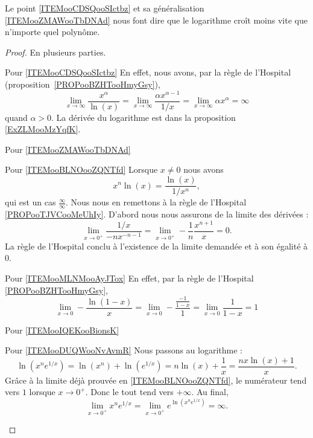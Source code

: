 Le point \ref{ITEMooCDSQooSIctbz} et sa généralisation \ref{ITEMooZMAWooTbDNAd} nous font dire que le logarithme croît moins vite que n'importe quel polynôme.

\begin{proof}
	En plusieurs parties.
	\begin{subproof}
		\item[Pour \ref{ITEMooCDSQooSIctbz}]
		En effet, nous avons, par la règle de l'Hospital (proposition~\ref{PROPooBZHTooHmyGsy}),
		\begin{equation}
			\lim_{x\to\infty} \frac{ x^{\alpha} }{ \ln(x) }=\lim_{x\to\infty} \frac{ \alpha x^{\alpha-1} }{ 1/x }=\lim_{x\to\infty} \alpha x^{\alpha}=\infty
		\end{equation}
		quand \( \alpha>0\). La dérivée du logarithme est dans la proposition \ref{ExZLMooMzYqfK}.
		\item[Pour \ref{ITEMooZMAWooTbDNAd}]
		\item[Pour \ref{ITEMooBLNOooZQNTfd}]
		Lorsque \( x\neq 0\) nous avons
		\begin{equation}
			x^n\ln(x)=\frac{ \ln(x) }{ 1/x^n },
		\end{equation}
		qui est un cas \( \frac{ \infty }{ \infty }\). Nous nous en remettons à la règle de l'Hospital \ref{PROPooTJVCooMeUhIy}. D'abord nous nous assurons de la limite des dérivées :
		\begin{equation}
			\lim_{x\to 0^+} \frac{ 1/x }{ -nx^{-n-1} }=\lim_{x\to 0^+} -\frac{1}{ n }\frac{ x^{n+1} }{ x }=0.
		\end{equation}
		La règle de l'Hospital conclu à l'existence de la limite demandée et à son égalité à \( 0\).
		\item[Pour \ref{ITEMooMLNMooAyJTox}]
		En effet, par la règle de l'Hospital \ref{PROPooBZHTooHmyGsy},
		\begin{equation}    \label{EqGICpOX}
			\lim_{x\to 0} -\frac{ \ln(1-x) }{ x }=\lim_{x\to 0} -\frac{ \frac{ -1 }{ 1-x } }{ 1 }=\lim_{x\to 0} \frac{1}{ 1-x }=1
		\end{equation}
		\item[Pour \ref{ITEMooIQEKooBionsK}]
		\item[Pour \ref{ITEMooDUQWooNvAvmR}]
		Nous passons au logarithme :
		\begin{equation}
			\ln(x^n e^{1/x})=\ln(x^n)+\ln( e^{1/x})=n\ln(x)+\frac{1}{ x }=\frac{ n x\ln(x)+1 }{ x }.
		\end{equation}
		Grâce à la limite déjà prouvée en \ref{ITEMooBLNOooZQNTfd}, le numérateur tend vers \( 1\) lorsque \( x\to 0^+\). Donc le tout tend vers \( +\infty\). Au final,
		\begin{equation}
			\lim_{x\to 0^+} x^n e^{1/x}=\lim_{x\to 0^+}  e^{\ln(x^n e^{1/x})}=\infty.
		\end{equation}
	\end{subproof}
\end{proof}

